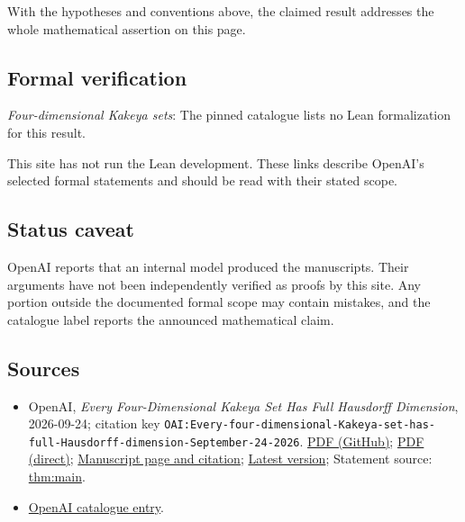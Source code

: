 \documentclass[11pt]{article}
\begin{document}
With the hypotheses and conventions above, the claimed result addresses the whole mathematical assertion on this page.

\subsection{Formal verification}
\textit{Four-dimensional Kakeya sets}: The pinned catalogue lists no Lean formalization for this result.

This site has not run the Lean development. These links describe OpenAI’s selected formal statements and should be read with their stated scope.

\subsection{Status caveat}
OpenAI reports that an internal model produced the manuscripts. Their arguments have not been independently verified as proofs by this site. Any portion outside the documented formal scope may contain mistakes, and the catalogue label reports the announced mathematical claim.

\subsection{Sources}
\begin{itemize}
\item OpenAI, \emph{Every Four-Dimensional Kakeya Set Has Full Hausdorff Dimension}, 2026-09-24; citation key \texttt{OAI:Every-four-dimensional-Kakeya-set-has-full-Hausdorff-dimension-September-24-2026}. \href{https://github.com/openai/math/blob/adc7f1241b42e322a6451854ab7e4b4c146bf78a/preprints/Every-four-dimensional-Kakeya-set-has-full-Hausdorff-dimension-September-24-2026/paper.pdf}{PDF (GitHub)}; \href{https://github.com/openai/math/raw/adc7f1241b42e322a6451854ab7e4b4c146bf78a/preprints/Every-four-dimensional-Kakeya-set-has-full-Hausdorff-dimension-September-24-2026/paper.pdf}{PDF (direct)}; \href{https://github.com/openai/math/blob/adc7f1241b42e322a6451854ab7e4b4c146bf78a/preprints/Every-four-dimensional-Kakeya-set-has-full-Hausdorff-dimension-September-24-2026/README.md}{Manuscript page and citation}; \href{https://github.com/openai/math/blob/main/preprints/Every-four-dimensional-Kakeya-set-has-full-Hausdorff-dimension-September-24-2026/paper.pdf}{Latest version}; Statement source: \href{https://github.com/openai/math/blob/adc7f1241b42e322a6451854ab7e4b4c146bf78a/preprints/Every-four-dimensional-Kakeya-set-has-full-Hausdorff-dimension-September-24-2026/build/sections/01-introduction.tex\#L8}{thm:main}.
\item \href{https://github.com/openai/math/blob/adc7f1241b42e322a6451854ab7e4b4c146bf78a/CONTENTS.md}{OpenAI catalogue entry}.
\end{itemize}
\end{document}
